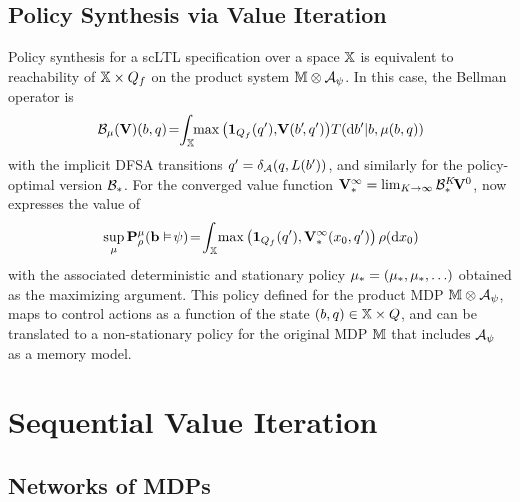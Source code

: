 \documentclass[conference]{IEEEtran}
\newcommand{\red}[1]{{\color{red} #1 }}
\begin{document}
\subsection{Policy Synthesis via Value Iteration}

Policy synthesis for a scLTL specification over a space $\mathbb{X}$ is equivalent to reachability of $\mathbb{X}\times Q_f$ on the product system $\mathbb{M} \otimes \mathcal{A}_\psi$. In this case, the Bellman operator is
\begin{equation}
\label{eq:V_recopt_inf_mu}
  \bellman_\pol (\mathbf V)(b,q)\! = \hspace{-1mm} \int_{\X} \hspace{-1mm} \max \left( \mathbf 1_{Q_f}(q'), \!\mathbf V( b'\!, q') \right)\! {\tr}(\mathrm{d} b' |b,\pol(b,q))\!
\end{equation}
with the implicit DFSA transitions  $q' =\delta_{\mathcal{A}}(q,L(b'))$, %
and similarly for the policy-optimal version $\mathcal{B}_*$.  For the converged value function $\mathbf V^\infty_* =  \lim_{K\rightarrow\infty}\mathcal{B}_*^K\! \mathbf V^0$, now expresses the value of
\begin{equation}
\label{eq:prob:_optimal} 
 \sup_{\pol}\mathbf{P}_\init^{\pol}( {\mathbf{b}} \vDash\! \psi)\! =\!
  \int_{\X} \! \max \left( \mathbf 1_{Q_f}( q'), 
   \mathbf V^\infty_*(x_0, q') \right) \init(\mathrm{d} x_0) \!
\end{equation}
with the associated deterministic and stationary policy $ \mu_*=(\mu_*,\mu_*,\ldots)$ obtained as the maximizing argument. 
This policy defined for the product MDP $\mathbb{M} \otimes \mathcal{A}_\psi$, maps to control actions as a function of the state $(b,q) \in \mathbb{X} \times Q$, and can be translated to a non-stationary policy for the original MDP $\mathbb{M}$ that includes $\mathcal{A}_\psi$ as a memory model.


\section{Sequential Value Iteration}


\subsection{Networks of MDPs}
\end{document}
